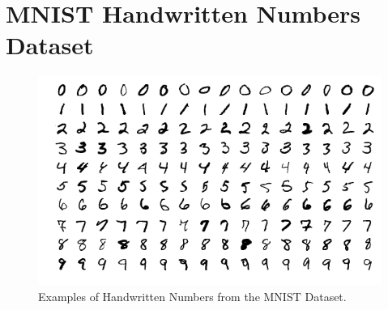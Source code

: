 
\section{\ac{MNIST} Handwritten Numbers Dataset}
\begin{figure}[H]
        \begin{center}
	    \includegraphics[scale=0.40]{images/handwrittenCrops.png}
	    \caption[Examples of Handwritten Numbers from the \ac{MNIST} Dataset.]{Examples of Handwritten Numbers from the \ac{MNIST} Dataset.\footnotemark}
	    \label{fig:handwrittenCrops}
	    \end{center}
\end{figure}


